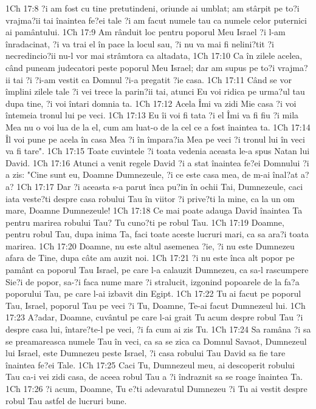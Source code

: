 1Ch 17:8  ?i am fost cu tine pretutindeni, oriunde ai umblat; am stârpit pe to?i vrajma?ii tai înaintea fe?ei tale ?i am facut numele tau ca numele celor puternici ai pamântului.
1Ch 17:9  Am rânduit loc pentru poporul Meu Israel ?i l-am înradacinat, ?i va trai el în pace la locul sau, ?i nu va mai fi nelini?tit ?i necredincio?ii nu-l vor mai strâmtora ca altadata,
1Ch 17:10  Ca în zilele acelea, când puneam judecatori peste poporul Meu Israel; dar am supus pe to?i vrajma?ii tai ?i ?i-am vestit ca Domnul ?i-a pregatit ?ie casa.
1Ch 17:11  Când se vor împlini zilele tale ?i vei trece la parin?ii tai, atunci Eu voi ridica pe urma?ul tau dupa tine, ?i voi întari domnia ta.
1Ch 17:12  Acela Îmi va zidi Mie casa ?i voi întemeia tronul lui pe veci.
1Ch 17:13  Eu îi voi fi tata ?i el Îmi va fi fiu ?i mila Mea nu o voi lua de la el, cum am luat-o de la cel ce a fost înaintea ta.
1Ch 17:14  Îl voi pune pe acela în casa Mea ?i în împara?ia Mea pe veci ?i tronul lui în veci va fi tare".
1Ch 17:15  Toate cuvintele ?i toata vedenia aceasta le-a spus Natan lui David.
1Ch 17:16  Atunci a venit regele David ?i a stat înaintea fe?ei Domnului ?i a zis: "Cine sunt eu, Doamne Dumnezeule, ?i ce este casa mea, de m-ai înal?at a?a?
1Ch 17:17  Dar ?i aceasta s-a parut înca pu?in în ochii Tai, Dumnezeule, caci iata veste?ti despre casa robului Tau în viitor ?i prive?ti la mine, ca la un om mare, Doamne Dumnezeule!
1Ch 17:18  Ce mai poate adauga David înaintea Ta pentru marirea robului Tau? Tu cuno?ti pe robul Tau.
1Ch 17:19  Doamne, pentru robul Tau, dupa inima Ta, faci toate aceste lucruri mari, ca sa ara?i toata marirea.
1Ch 17:20  Doamne, nu este altul asemenea ?ie, ?i nu este Dumnezeu afara de Tine, dupa câte am auzit noi.
1Ch 17:21  ?i nu este înca alt popor pe pamânt ca poporul Tau Israel, pe care l-a calauzit Dumnezeu, ca sa-l rascumpere Sie?i de popor, sa-?i faca nume mare ?i stralucit, izgonind popoarele de la fa?a poporului Tau, pe care l-ai izbavit din Egipt.
1Ch 17:22  Tu ai facut pe poporul Tau, Israel, poporul Tau pe veci ?i Tu, Doamne, Te-ai facut Dumnezeul lui.
1Ch 17:23  A?adar, Doamne, cuvântul pe care l-ai grait Tu acum despre robul Tau ?i despre casa lui, întare?te-l pe veci, ?i fa cum ai zis Tu.
1Ch 17:24  Sa ramâna ?i sa se preamareasca numele Tau în veci, ca sa se zica ca Domnul Savaot, Dumnezeul lui Israel, este Dumnezeu peste Israel, ?i casa robului Tau David sa fie tare înaintea fe?ei Tale.
1Ch 17:25  Caci Tu, Dumnezeul meu, ai descoperit robului Tau ca-i vei zidi casa, de aceea robul Tau a ?i îndraznit sa se roage înaintea Ta.
1Ch 17:26  ?i acum, Doamne, Tu e?ti adevaratul Dumnezeu ?i Tu ai vestit despre robul Tau astfel de lucruri bune.
